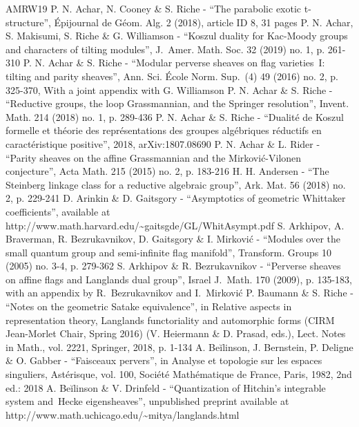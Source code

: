 \documentclass[10pt]{article}
\theoremstyle{remark}
\numberwithin{equation}{section}
\begin{document}
\begin{thebibliography}{AMRW19}
 P. N. Achar, N. Cooney \& S. Riche - “The parabolic exotic t-structure”, Épijournal de Géom. Alg. 2 (2018), article ID 8, 31 pages
 P. N. Achar, S. Makisumi, S. Riche \& G. Williamson - “Koszul duality for Kac-Moody groups and characters of tilting modules”, J. Amer. Math. Soc. 32 (2019) no. 1, p. 261-310
 P. N. Achar \& S. Riche - “Modular perverse sheaves on flag varieties I: tilting and parity sheaves”, Ann. Sci. École Norm. Sup. (4) 49 (2016) no. 2, p. 325-370, With a joint appendix with G. Williamson
 P. N. Achar \& S. Riche - “Reductive groups, the loop Grassmannian, and the Springer resolution”, Invent. Math. 214 (2018) no. 1, p. 289-436
 P. N. Achar \& S. Riche - “Dualité de Koszul formelle et théorie des représentations des groupes algébriques réductifs en caractéristique positive”, 2018, arXiv:1807.08690
 P. N. Achar \& L. Rider - “Parity sheaves on the affine Grassmannian and the Mirković-Vilonen conjecture”, Acta Math. 215 (2015) no. 2, p. 183-216
 H. H. Andersen - “The Steinberg linkage class for a reductive algebraic group”, Ark. Mat. 56 (2018) no. 2, p. 229-241
 D. Arinkin \& D. Gaitsgory - “Asymptotics of geometric Whittaker coefficients”, available at http://www.math.harvard.edu/\textasciitilde{}gaitsgde/GL/WhitAsympt.pdf
 S. Arkhipov, A. Braverman, R. Bezrukavnikov, D. Gaitsgory \& I. Mirković - “Modules over the small quantum group and semi-infinite flag manifold”, Transform. Groups 10 (2005) no. 3-4, p. 279-362
 S. Arkhipov \& R. Bezrukavnikov - “Perverse sheaves on affine flags and Langlands dual group”, Israel J. Math. 170 (2009), p. 135-183, with an appendix by R. Bezrukavnikov and I. Mirković
 P. Baumann \& S. Riche - “Notes on the geometric Satake equivalence”, in Relative aspects in representation theory, Langlands functoriality and automorphic forms (CIRM Jean-Morlet Chair, Spring 2016) (V. Heiermann \& D. Prasad, eds.), Lect. Notes in Math., vol. 2221, Springer, 2018, p. 1-134
 A. Beĭlinson, J. Bernstein, P. Deligne \& O. Gabber - “Faisceaux pervers”, in Analyse et topologie sur les espaces singuliers, Astérisque, vol. 100, Société Mathématique de France, Paris, 1982, 2nd ed.: 2018
 A. Beĭlinson \& V. Drinfeld - “Quantization of Hitchin’s integrable system and Hecke eigensheaves”, unpublished preprint available at http://www.math.uchicago.edu/\textasciitilde{}mitya/langlands.html

\end{thebibliography}
\end{document}
